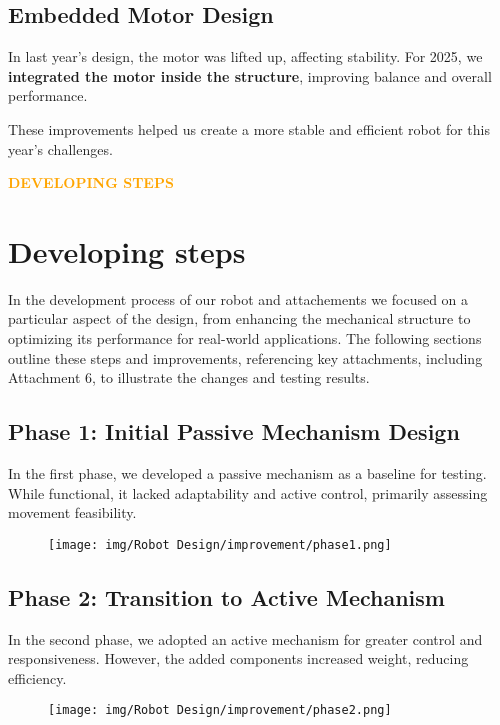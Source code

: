 \subsection{Embedded Motor Design}
In last year’s design, the motor was lifted up, affecting stability. For 2025, we \textbf{integrated the motor inside the structure}, improving balance and overall performance.

These improvements helped us create a more stable and efficient robot for this year’s challenges.


\newpage
\begin{center}
    \huge \textbf{\textcolor{orange}{DEVELOPING STEPS}} \\[0.5cm]
\end{center}
\section{Developing steps}


In the development process of our robot and attachements we focused on a particular aspect of the design, from enhancing the mechanical structure to optimizing its performance for real-world applications. The following sections outline these steps and improvements, referencing key attachments, including Attachment 6, to illustrate the changes and testing results.


\subsection*{Phase 1: Initial Passive Mechanism Design}


In the first phase, we developed a passive mechanism as a baseline for testing. While functional, it lacked adaptability and active control, primarily assessing movement feasibility.
\begin{figure}[h!]
    \centering
        \texttt{[image: img/Robot Design/improvement/phase1.png]}
        
    \end{figure}
    
\subsection*{Phase 2: Transition to Active Mechanism}

In the second phase, we adopted an active mechanism for greater control and responsiveness. However, the added components increased weight, reducing efficiency.
\begin{figure}[h!]
    \centering
        \texttt{[image: img/Robot Design/improvement/phase2.png]}
        
    \end{figure}
\newpage    

